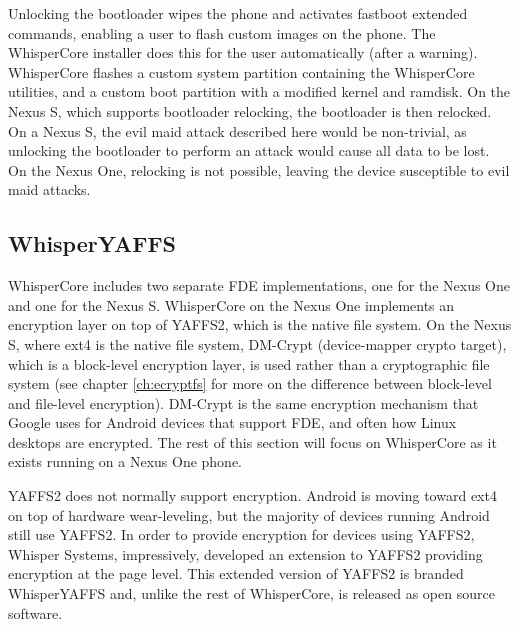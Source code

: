 Unlocking the bootloader wipes the phone and activates fastboot extended commands, enabling a user to flash custom images on the
phone.  The WhisperCore installer does this for the user automatically (after a warning).  WhisperCore flashes a custom system
partition containing the WhisperCore utilities, and a custom boot partition with a modified kernel and ramdisk.  On the Nexus S,
which supports bootloader relocking, the bootloader is then relocked.  On a Nexus S, the evil maid attack described here would be
non-trivial, as unlocking the bootloader to perform an attack would cause all data to be lost.  On the Nexus One, relocking is not
possible, leaving the device susceptible to evil maid attacks. 

\subsection{WhisperYAFFS}
WhisperCore includes two separate FDE implementations, one for the Nexus One and one for the Nexus S. WhisperCore on the Nexus
One implements an encryption layer on top of YAFFS2, which is the native file system.  On the Nexus S, where ext4 is the native
file system, DM-Crypt (device-mapper crypto target), which is a block-level encryption layer, is used rather than a cryptographic
file system (see chapter \ref{ch:ecryptfs} for more on the difference between block-level and file-level encryption).  DM-Crypt is the
same encryption mechanism that Google uses for Android devices that support FDE, and often how Linux desktops are encrypted.  The
rest of this section will focus on WhisperCore as it exists running on a Nexus One phone.

YAFFS2 does not normally support encryption.  Android is moving toward ext4 on top of hardware wear-leveling, but the majority of
devices running Android still use YAFFS2.  In order to provide encryption for devices using YAFFS2, Whisper Systems, impressively,
developed an extension to YAFFS2 providing encryption at the page level.  This extended version of YAFFS2 is branded WhisperYAFFS
and, unlike the rest of WhisperCore, is released as open source software.

